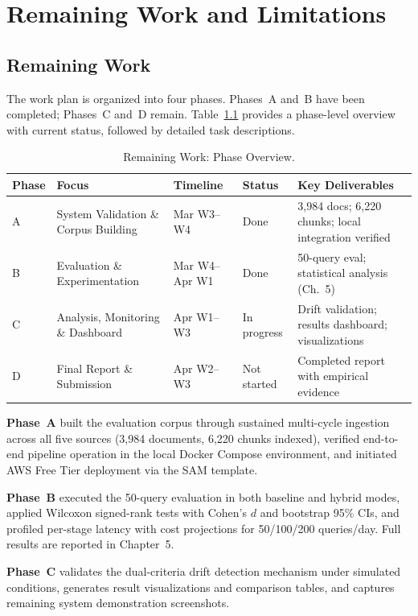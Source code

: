 \chapter{Remaining Work and Limitations}

\section{Remaining Work}
\label{sec:remaining}

The work plan is organized into four phases. Phases~A and~B have been completed; Phases~C and~D remain. Table~\ref{tab:remaining_phases} provides a phase-level overview with current status, followed by detailed task descriptions.

\begin{table}[H]
\caption{Remaining Work: Phase Overview.}
\label{tab:remaining_phases}
\centering
\begin{tabular}{p{0.8cm}p{3.5cm}p{2.5cm}p{1.8cm}p{4.0cm}}
\toprule
\textbf{Phase} & \textbf{Focus} & \textbf{Timeline} & \textbf{Status} & \textbf{Key Deliverables} \\
\midrule
A & System Validation \& Corpus Building & Mar W3--W4 & Done & 3{,}984 docs; 6{,}220 chunks; local integration verified \\
B & Evaluation \& Experimentation & Mar W4--Apr W1 & Done & 50-query eval; statistical analysis (Ch.~5) \\
C & Analysis, Monitoring \& Dashboard & Apr W1--W3 & In progress & Drift validation; results dashboard; visualizations \\
D & Final Report \& Submission & Apr W2--W3 & Not started & Completed report with empirical evidence \\
\bottomrule
\end{tabular}
\end{table}

\textbf{Phase~A} built the evaluation corpus through sustained multi-cycle ingestion across all five sources (3{,}984 documents, 6{,}220 chunks indexed), verified end-to-end pipeline operation in the local Docker Compose environment, and initiated AWS Free Tier deployment via the SAM template.

\textbf{Phase~B} executed the 50-query evaluation in both baseline and hybrid modes, applied Wilcoxon signed-rank tests with Cohen's $d$ and bootstrap 95\% CIs, and profiled per-stage latency with cost projections for 50/100/200 queries/day. Full results are reported in Chapter~5.

\textbf{Phase~C} validates the dual-criteria drift detection mechanism under simulated conditions, generates result visualizations and comparison tables, and captures remaining system demonstration screenshots.

